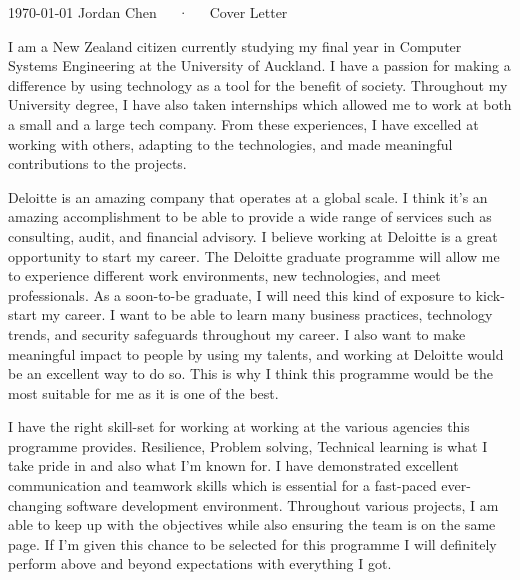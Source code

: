 \documentclass[11pt, a4paper]{awesome-cv}
\begin{document}
\makecvheader[L]

\makecvfooter
  {\today}
  {Jordan Chen~~~·~~~Cover Letter}
  {}

\makelettertitle

\begin{cvletter}

I am a New Zealand citizen currently studying my final year in Computer Systems Engineering at the University of Auckland. I have a passion for making a difference by using technology as a tool for the benefit of society. Throughout my University degree, I have also taken internships which allowed me to work at both a small and a large tech company. From these experiences, I have excelled at working with others, adapting to the technologies, and made meaningful contributions to the projects.

Deloitte is an amazing company that operates at a global scale. I think it's an amazing accomplishment to be able to provide a wide range of services such as consulting, audit, and financial advisory. I believe working at Deloitte is a great opportunity to start my career. The Deloitte graduate programme will allow me to experience different work environments, new technologies, and meet professionals. As a soon-to-be graduate, I will need this kind of exposure to kick-start my career. I want to be able to learn many business practices, technology trends, and security safeguards throughout my career. I also want to make meaningful impact to people by using my talents, and working at Deloitte would be an excellent way to do so. This is why I think this programme would be the most suitable for me as it is one of the best.

I have the right skill-set for working at working at the various agencies this programme provides. Resilience, Problem solving, Technical learning is what I take pride in and also what I'm known for. I have demonstrated excellent communication and teamwork skills which is essential for a fast-paced ever-changing software development environment. Throughout various projects, I am able to keep up with the objectives while also ensuring the team is on the same page. If I'm given this chance to be selected for this programme I will definitely perform above and beyond expectations with everything I got.

\end{cvletter}


\makeletterclosing
\end{document}
